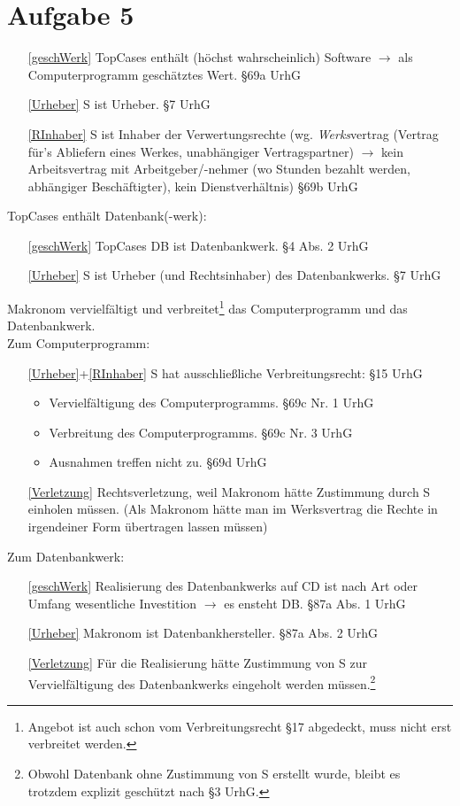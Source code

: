 \documentclass{scrreprt}
\begin{document}
\chapter{Aufgabe 5}
\begin{itemize}
\item[\ref{geschWerk}] TopCases enthält (höchst wahrscheinlich) Software $\to$ als Computerprogramm geschätztes Wert. \hfill §69a UrhG
\item[\ref{Urheber}] S ist Urheber. \hfill §7 UrhG
\item[\ref{RInhaber}] S ist Inhaber der Verwertungsrechte (wg. \emph{Werks}vertrag (Vertrag für's Abliefern eines Werkes, unabhängiger Vertragspartner) $\to$ kein Arbeitsvertrag mit Arbeitgeber/-nehmer (wo Stunden bezahlt werden, abhängiger Beschäftigter), kein Dienstverhältnis) \hfill §69b UrhG
\end{itemize}
TopCases enthält Datenbank(-werk):
\begin{itemize}
\item[\ref{geschWerk}] TopCases DB ist Datenbankwerk. \hfill §4 Abs. 2 UrhG
\item[\ref{Urheber}] S ist Urheber (und Rechtsinhaber) des Datenbankwerks. \hfill §7 UrhG
\end{itemize}
Makronom vervielfältigt und verbreitet\footnote{Angebot ist auch schon vom Verbreitungsrecht §17 abgedeckt, muss nicht erst verbreitet werden.} das Computerprogramm und das Datenbankwerk.\\
Zum Computerprogramm:
\begin{itemize}
\item[\ref{Urheber}+\ref{RInhaber}] S hat ausschließliche Verbreitungsrecht: \hfill §15 UrhG
\begin{itemize}
\item Vervielfältigung des Computerprogramms. \hfill §69c Nr. 1 UrhG
\item Verbreitung des Computerprogramms. \hfill §69c Nr. 3 UrhG
\item Ausnahmen treffen nicht zu. \hfill §69d UrhG
\end{itemize}
\item[\ref{Verletzung}] Rechtsverletzung, weil Makronom hätte Zustimmung durch S einholen müssen. (Als Makronom hätte man im Werksvertrag die Rechte in irgendeiner Form übertragen lassen müssen)
\end{itemize}
Zum Datenbankwerk:
\begin{itemize}
\item[\ref{geschWerk}] Realisierung des Datenbankwerks auf CD ist nach Art oder Umfang wesentliche Investition $\to$ es ensteht DB. \hfill §87a Abs. 1 UrhG
\item[\ref{Urheber}] Makronom ist Datenbankhersteller. \hfill §87a Abs. 2 UrhG
\item[\ref{Verletzung}] Für die Realisierung hätte Zustimmung von S zur Vervielfältigung des Datenbankwerks eingeholt werden müssen.\footnote{Obwohl Datenbank ohne Zustimmung von S erstellt wurde, bleibt es trotzdem explizit geschützt nach §3 UrhG.}
\end{itemize}
\end{document}
